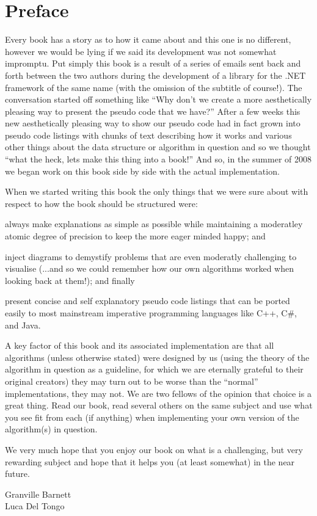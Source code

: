 \chapter*{Preface}
Every book has a story as to how it came about and this one is no different, however we would be lying if we said its development was not somewhat impromptu. Put simply this book is a result of a series of emails sent back and forth between the two authors during the development of a library for the .NET framework of the same name (with the omission of the subtitle of course!). The conversation started off something like ``Why don't we create a more aesthetically pleasing way to present the pseudo code that we have?'' After a few weeks this new aesthetically pleasing way to show our pseudo code had in fact grown into pseudo code listings with chunks of text describing how it works and various other things about the data structure or algorithm in question and so we thought ``what the heck, lets make this thing into a book!'' And so, in the summer of 2008 we began work on this book side by side with the actual implementation.

When we started writing this book the only things that we were sure about with respect to how the book should be structured were:
\begin{inparaenum}
\item always make explanations as simple as possible while maintaining a moderatley atomic degree of precision to keep the more eager minded happy; and
\item inject diagrams to demystify problems that are even moderatly challenging to visualise (...and so we could remember how our own algorithms worked when looking back at them!); and finally
\item present concise and self explanatory pseudo code listings that can be ported easily to most mainstream imperative programming languages like C++, C\#, and Java.
\end{inparaenum} 

A key factor of this book and its associated implementation are that all algorithms (unless otherwise stated) were designed by us (using the theory of the algorithm in question as a guideline, for which we are eternally grateful to their original creators) they may turn out to be worse than the ``normal'' implementations, they may not. We are two fellows of the opinion that choice is a great thing. Read our book, read several others on the same subject and use what you see fit from each (if anything) when implementing your own version of the algorithm(s) in question.

We very much hope that you enjoy our book on what is a challenging, but very rewarding subject and hope that it helps you (at least somewhat) in the near future.


\begin{center}
Granville Barnett \\
Luca Del Tongo
\end{center}
